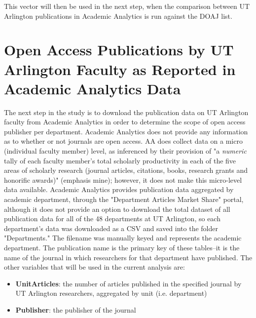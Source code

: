\documentclass{article}
\begin{document}
This vector will then be used in the next step, when the comparison between UT Arlington publications in Academic Analytics is run against the DOAJ list. 

\section{Open Access Publications by UT Arlington Faculty as Reported in Academic Analytics Data}
The next step in the study is to download the publication data on UT Arlington faculty from Academic Analytics in order to determine the scope of open access publisher per department.
Academic Analytics does not provide any information as to whether or not journals are open access. 
AA does collect data on a micro (individual faculty member) level, as inferenced by their provision of "a \textit{numeric} tally of each faculty member’s total scholarly productivity in each of the five areas of scholarly research (journal articles, citations, books, research grants and honorific awards)" (emphasis mine); however, it does not make this micro-level data available. 
Academic Analytics provides publication data aggregated by academic department, through the "Department Articles Market Share" portal, although it does not provide an option to download the total dataset of all publication data for all of the 48 departments at UT Arlington, so each department's data was downloaded as a CSV and saved into the folder "Departments."
The filename was manually keyed and represents the academic department.
The publication name is the primary key of these tables--it is the name of the journal in which researchers for that department have published.
The other variables that will be used in the current analysis are:
\begin{itemize}
	\item \textbf{UnitArticles}: the number of articles published in the specified journal by UT Arlington researchers, aggregated by unit (i.e. department)
	\item \textbf{Publisher}: the publisher of the journal
\end{itemize}
\end{document}
